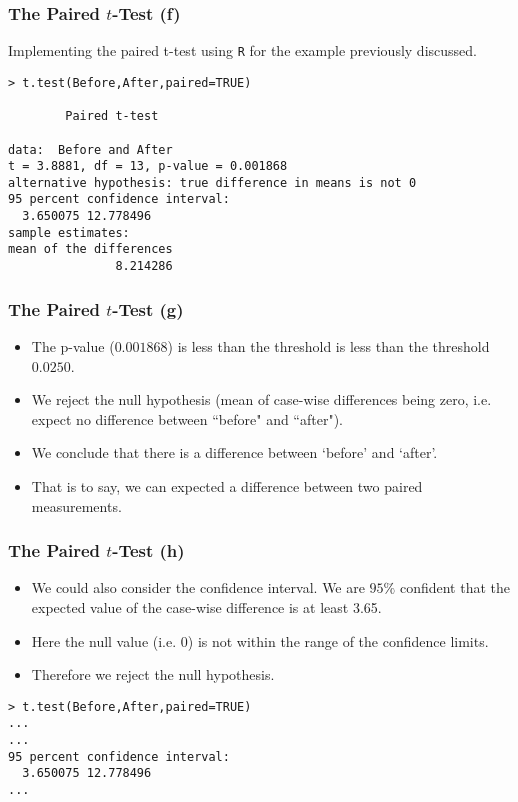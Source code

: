 \documentclass[a4]{beamer}
\begin{document}
\begin{frame}[fragile]
\frametitle{The Paired $t$-Test (f)}
Implementing the paired t-test using \texttt{R} for the example previously discussed.
\begin{verbatim}
> t.test(Before,After,paired=TRUE)

        Paired t-test

data:  Before and After
t = 3.8881, df = 13, p-value = 0.001868
alternative hypothesis: true difference in means is not 0
95 percent confidence interval:
  3.650075 12.778496
sample estimates:
mean of the differences
               8.214286

\end{verbatim}
\end{frame}

\begin{frame}[fragile]
\frametitle{The Paired $t$-Test (g)}
\begin{itemize}
\item The p-value ($0.001868$) is less than the threshold is less than the threshold $0.0250$.
\item We reject the null hypothesis (mean of case-wise differences being zero, i.e. expect no difference between ``before" and ``after").
\item We conclude that there is a difference between `before' and `after'.
\item That is to say, we can expected a difference between two paired measurements.
\end{itemize}
\end{frame}
\begin{frame}[fragile]
\frametitle{The Paired $t$-Test (h)}
\begin{itemize}
\item We could also consider the confidence interval. We are $95\%$ confident that the expected value of the case-wise difference is at least 3.65.
\item Here the null value (i.e. 0) is not within the range of the confidence limits.
\item Therefore we reject the null hypothesis.
\end{itemize}
\begin{verbatim}
> t.test(Before,After,paired=TRUE)
...
...
95 percent confidence interval:
  3.650075 12.778496
...
\end{verbatim}
\end{frame}
\end{document}
